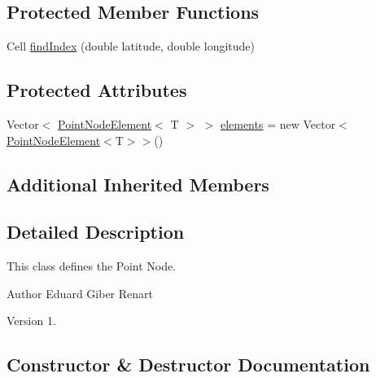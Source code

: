 \subsection*{Protected Member Functions}
\begin{DoxyCompactItemize}
\item 
Cell \hyperlink{classcom_1_1rutgers_1_1QuadTree_1_1PointNode_a6d835e3113b4c96c6300a09dd3702d81}{find\+Index} (double latitude, double longitude)
\end{DoxyCompactItemize}
\subsection*{Protected Attributes}
\begin{DoxyCompactItemize}
\item 
Vector$<$ \hyperlink{classcom_1_1rutgers_1_1QuadTree_1_1PointNodeElement}{Point\+Node\+Element}$<$ T $>$ $>$ \hyperlink{classcom_1_1rutgers_1_1QuadTree_1_1PointNode_a0e05238a78062b65ab3953980cb8889c}{elements} = new Vector$<$\hyperlink{classcom_1_1rutgers_1_1QuadTree_1_1PointNodeElement}{Point\+Node\+Element}$<$T$>$$>$()
\end{DoxyCompactItemize}
\subsection*{Additional Inherited Members}


\subsection{Detailed Description}
This class defines the Point Node.

\begin{DoxyAuthor}{Author}
Eduard Giber Renart 
\end{DoxyAuthor}
\begin{DoxyVersion}{Version}
1. 
\end{DoxyVersion}


\subsection{Constructor \& Destructor Documentation}
\mbox{\label{classcom_1_1rutgers_1_1QuadTree_1_1PointNode_a3c57944cb98cfd710608b57fefcd64c2}} 
